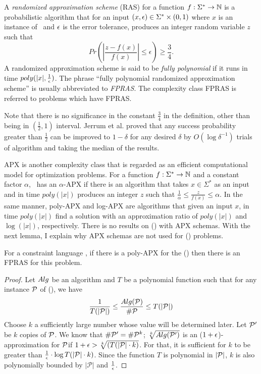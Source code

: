 A \emph{randomized approximation scheme} (RAS) for a function \(f:\Sigma^*\to\mathbb{N}\)
is a probabilistic algorithm that for an input \((x,\epsilon)\in\Sigma^*\times(0,1)\) 
where \(x\) is an instance of \mf\ and \(\epsilon\) is the error tolerance, 
produces an integer random variable \(z\) such that 
\[Pr\left(\left|\frac{z-f(x)}{f(x)}\right|\le \epsilon\right) \ge \frac{3}{4}.\]
A randomized approximation scheme is said to be \emph{fully polynomial} if it runs in time \(poly(|x|,\frac{1}{\epsilon})\)\@. 
The phrase ``fully polynomial randomized approximation scheme'' is usually abbreviated to 
\emph{FPRAS}\@. The complexity class FPRAS is referred to problems which have FPRAS\@.

Note that there is no significance in the constant \(\frac{3}{4}\) in the definition,
other than being in \((\frac{1}{2},1)\) interval. 
Jerrum et al. \cite{JVV} proved that any success probability 
greater than \(\frac{1}{2}\) can be improved to \(1-\delta\) for any desired \(\delta\) by
\(O(\log \delta^{-1})\) trials of algorithm and taking the median of the results.

APX is another complexity class that is regarded as an efficient computational model for
optimization problems.
For a function \(f:\Sigma^*\to\mathbb{N}\) and a constant factor \(\alpha\),
\mf\ has an \(\alpha\)-APX if there is an algorithm that
takes \(x\in\Sigma^*\) as an input and in time \(poly(|x|)\) produces an integer \(z\)
such that \(\frac{1}{\alpha}\le\frac{z}{f(x)}\le \alpha\). In the same manner,
poly-APX and log-APX are algorithms that given an input
\(x\), in time \(poly(|x|)\) find a solution with an approximation ratio of \(poly(|x|)\)
and \(\log(|x|)\), respectively. There is no results on \ccsp(\mrelset) with
APX schemas. With the next lemma, I explain why APX schemas are not used for \ccsp(\mrelset) problems.

\begin{lemma}[Hedayaty 2012]
For a constraint language \mrelset, if there is a poly-APX for
the \ccsp(\mrelset) then there is an FPRAS for this problem.
\end{lemma}

\begin{proof}
Let \(Alg\) be an algorithm and \(T\) be a polynomial function such
that for any instance \(\mathcal{P}\)
of \ccsp(\mrelset), we have 
\[\frac{1}{T(|\mathcal{P}|)} \le \frac{Alg(\mathcal{P})}{\#\mathcal{P}} \le T(|\mathcal{P}|)\]
Choose \(k\) a sufficiently large number whose value
will be determined later. Let \(\mathcal{P}'\) be \(k\) copies of \(\mathcal{P}\)\@.
We know that \(\#\mathcal{P}'=\#\mathcal{P}^k\); \(\sqrt[k]{Alg(\mathcal{P}')}\) is 
an (\(1+\epsilon\))-approximation for \(\mathcal{P}\)\@ if \(1+\epsilon > \sqrt[k]{(T(|\mathcal{P}|\cdot k)}\)\@.
For that, it is sufficient for \(k\) to be greater than
\(\frac{1}{\epsilon}\cdot \log T(|\mathcal{P}|\cdot k)\)\@.
Since the function \(T\) is polynomial in \(|\mathcal{P}|\), \(k\) is also polynomially 
bounded by \(|\mathcal{P}|\) and \(\frac{1}{\epsilon}\)\@.
\end{proof}

